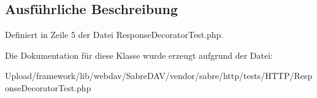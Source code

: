 \subsection{Ausführliche Beschreibung}


Definiert in Zeile 5 der Datei Response\+Decorator\+Test.\+php.



Die Dokumentation für diese Klasse wurde erzeugt aufgrund der Datei\+:\begin{DoxyCompactItemize}
\item 
Upload/framework/lib/webdav/\+Sabre\+D\+A\+V/vendor/sabre/http/tests/\+H\+T\+T\+P/Response\+Decorator\+Test.\+php\end{DoxyCompactItemize}
